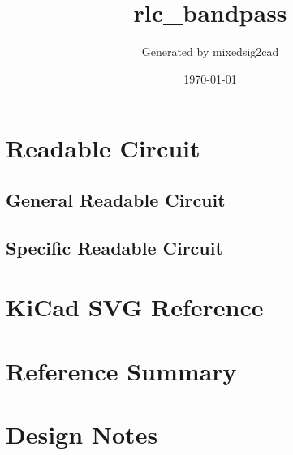 \documentclass[11pt]{article}
\title{rlc\_bandpass}
\author{Generated by mixedsig2cad}
\date{\today}
\begin{document}
\maketitle
\section{Readable Circuit}
\subsection{General Readable Circuit}

\subsection{Specific Readable Circuit}

\section{KiCad SVG Reference}
\section{Reference Summary}

\section{Design Notes}

\end{document}
